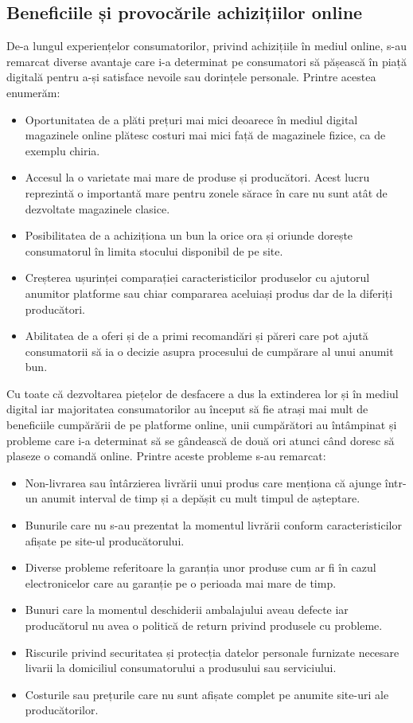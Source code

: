 \documentclass[a4paper, 12pt]{article}
\begin{document}
		\subsection{Beneficiile și provocările achizițiilor online}
		
		\quad De-a lungul experiențelor consumatorilor, privind achizițiile în mediul online, s-au remarcat diverse avantaje care i-a determinat pe consumatori să pășească în piață digitală pentru a-și satisface nevoile sau dorințele personale. Printre acestea enumerăm: 
		\begin{itemize}
			\renewcommand{\labelitemi}{$\Rightarrow$}
			\item Oportunitatea de a plăti prețuri mai mici deoarece în mediul digital magazinele online plătesc costuri mai mici față de magazinele fizice, ca de exemplu chiria.
			\item  Accesul la o varietate mai mare de produse și producători. Acest lucru reprezintă o importantă mare pentru zonele sărace în care nu sunt atât de dezvoltate magazinele clasice.
			\item Posibilitatea de a achiziționa un bun la orice ora și oriunde dorește consumatorul în limita stocului disponibil de pe site.
			\item Creșterea ușurinței comparației caracteristicilor produselor cu ajutorul anumitor platforme sau chiar compararea aceluiași produs dar de la diferiți producători.
			\item Abilitatea de a  oferi și de a primi recomandări și păreri care pot ajută consumatorii să ia o decizie asupra procesului de cumpărare al unui anumit bun.
		\end{itemize}
		
		\quad Cu toate că dezvoltarea piețelor de desfacere a dus la extinderea lor și în mediul digital iar majoritatea consumatorilor au început să fie atrași mai mult de beneficiile cumpărării de pe platforme online, unii cumpărători au întâmpinat și probleme care i-a determinat să se gândească de două ori atunci când doresc să plaseze o comandă online. Printre aceste probleme s-au remarcat: 
		\begin{itemize}
			\renewcommand{\labelitemi}{$\Rightarrow$}
			\item Non-livrarea sau întârzierea livrării unui produs care menționa că ajunge într-un anumit interval de timp și a depășit cu mult timpul de așteptare. 
			\item Bunurile care nu s-au prezentat la momentul livrării conform caracteristicilor afișate pe site-ul producătorului.
			\item Diverse probleme referitoare la garanția unor produse cum ar fi în cazul electronicelor care au garanție pe o perioada mai mare de timp.
			\item  Bunuri care la momentul deschiderii ambalajului aveau defecte iar producătorul nu avea o politică de return privind produsele cu probleme.
			\item Riscurile privind securitatea și protecția datelor personale furnizate necesare livarii la domiciliul consumatorului a produsului sau serviciului.
			\item Costurile sau prețurile care nu sunt afișate complet pe anumite site-uri ale producătorilor.
		\end{itemize}
\newpage
\end{document}
